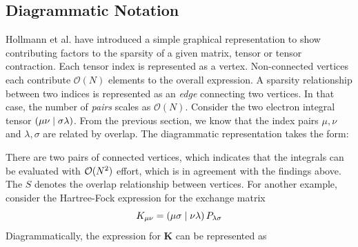

\subsection{Diagrammatic Notation}

Hollmann et al. \cite{Hol2017} have introduced a simple graphical representation to show contributing factors to the sparsity of a given matrix, tensor or tensor contraction. Each tensor index is represented as a vertex. Non-connected vertices each contribute $\mathcal{O}(N)$ elements to the overall expression. A sparsity relationship between two indices is represented as an \emph{edge} connecting two vertices. In that case, the number of \emph{pairs} scales as $\mathcal{O}(N)$. Consider the two electron integral tensor $\left( \mu\nu \mid \sigma\lambda \right)$. From the previous section, we know that the index pairs $\mu,\nu$ and $\lambda,\sigma$ are related by overlap. The diagrammatic representation takes the form:
\begin{center}
\end{center}
\noindent There are two pairs of connected vertices, which indicates that the integrals can be evaluated with $\mathcal{O}(N^{2})$ effort, which is in agreement with the findings above. The $S$ denotes the overlap relationship between vertices.
For another example, consider the Hartree-Fock expression for the exchange matrix
\begin{equation}
K_{\mu\nu} = \left( \mu\sigma \mid \nu\lambda \right) P_{\lambda\sigma}
\end{equation}
\noindent Diagrammatically, the expression for $\mathbf{K}$ can be represented as
